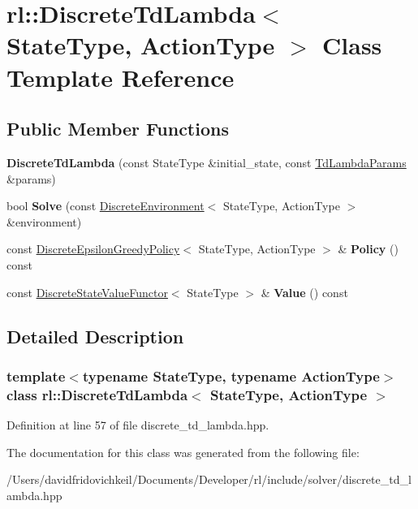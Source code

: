 \hypertarget{classrl_1_1_discrete_td_lambda}{}\section{rl\+:\+:Discrete\+Td\+Lambda$<$ State\+Type, Action\+Type $>$ Class Template Reference}
\label{classrl_1_1_discrete_td_lambda}
\subsection*{Public Member Functions}
\begin{DoxyCompactItemize}
\item 
\hypertarget{classrl_1_1_discrete_td_lambda_a0e27bad9a3b9e7c432bc2b2396c32ed4}{}\label{classrl_1_1_discrete_td_lambda_a0e27bad9a3b9e7c432bc2b2396c32ed4} 
{\bfseries Discrete\+Td\+Lambda} (const State\+Type \&initial\+\_\+state, const \hyperlink{structrl_1_1_td_lambda_params}{Td\+Lambda\+Params} \&params)
\item 
\hypertarget{classrl_1_1_discrete_td_lambda_a9458f4514c9cabe6083d54f7d9d195d4}{}\label{classrl_1_1_discrete_td_lambda_a9458f4514c9cabe6083d54f7d9d195d4} 
bool {\bfseries Solve} (const \hyperlink{classrl_1_1_discrete_environment}{Discrete\+Environment}$<$ State\+Type, Action\+Type $>$ \&environment)
\item 
\hypertarget{classrl_1_1_discrete_td_lambda_a2415e7f327ed838cac5d792d95dc1cb7}{}\label{classrl_1_1_discrete_td_lambda_a2415e7f327ed838cac5d792d95dc1cb7} 
const \hyperlink{classrl_1_1_discrete_epsilon_greedy_policy}{Discrete\+Epsilon\+Greedy\+Policy}$<$ State\+Type, Action\+Type $>$ \& {\bfseries Policy} () const
\item 
\hypertarget{classrl_1_1_discrete_td_lambda_a7feeec5e60b3ab723e957e767af95211}{}\label{classrl_1_1_discrete_td_lambda_a7feeec5e60b3ab723e957e767af95211} 
const \hyperlink{structrl_1_1_discrete_state_value_functor}{Discrete\+State\+Value\+Functor}$<$ State\+Type $>$ \& {\bfseries Value} () const
\end{DoxyCompactItemize}


\subsection{Detailed Description}
\subsubsection*{template$<$typename State\+Type, typename Action\+Type$>$\newline
class rl\+::\+Discrete\+Td\+Lambda$<$ State\+Type, Action\+Type $>$}



Definition at line 57 of file discrete\+\_\+td\+\_\+lambda.\+hpp.



The documentation for this class was generated from the following file\+:\begin{DoxyCompactItemize}
\item 
/\+Users/davidfridovichkeil/\+Documents/\+Developer/rl/include/solver/discrete\+\_\+td\+\_\+lambda.\+hpp\end{DoxyCompactItemize}
